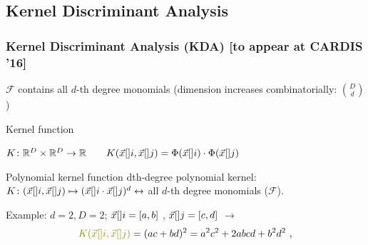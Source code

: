 \subsection{Kernel Discriminant Analysis}
\begin{frame}
[fragile]
\frametitle{Kernel Discriminant Analysis (KDA) [to appear at CARDIS '16]}
\vspace{-10pt}
\begin{figure}
\centering
{
}
\end{figure}
\vspace{-10pt}
$\mathcal{F}$ contains all $d$-th degree monomials \small{(dimension increases combinatorially: ${{D}\choose{d}}$)}
\pause

\begin{block}{Kernel function}
 \begin{centering}$K\colon\mathbb{R}^D\times \mathbb{R}^D \rightarrow \mathbb{R} \qquad K(\vec{x}[]{i},\vec{x}[]{j}) = \Phi(\vec{x}[]{i})\cdot \Phi(\vec{x}[]{j})
$\end{centering}
\end{block}
\pause
\vspace{-5pt}
\begin{block}{Polynomial kernel function}
dth-degree polynomial kernel: $K\colon(\vec{x}[]{i},\vec{x}[]{j}) \mapsto ( \vec{x}[]{i}\cdot \vec{x}[]{j})^d \leftrightarrow$  all $d$-th degree monomials ($\mathcal{F}$).
\pause

Example: 
$d=2, D=2$; $\vec{x}[]{i} = [a,b]$ , $\vec{x}[]{j} = [c,d]$ $\longrightarrow$
\vspace{-10pt}
\begin{equation*}
\textcolor{olive}{K(\vLeakVec[]{i},\vLeakVec[]{j})} = (ac + bd)^2 = a^2c^2 + 2abcd + b^2d^2 \mbox{ ,}
\end{equation*}


\end{block}
\end{frame}
